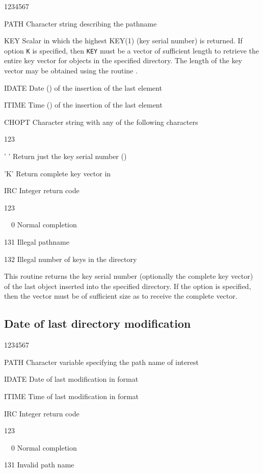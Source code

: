 \begin{DLtt}{1234567}
\item[PATH]Character string describing the pathname
\item[KEY]Scalar in which the highest KEY(1) (key serial number)
is returned. If option {\tt K} is specified, then {\tt KEY} must
be a vector of sufficient length to retrieve the entire key vector
for objects in the specified directory. The length of the key
vector may be obtained using the routine .
\item[IDATE]Date () of the insertion of the last element
\item[ITIME]Time ()   of the insertion of the last element
\item[CHOPT]Character string with any of the following characters
  \begin{DLtt}{123}
    \item[' ']Return just the key serial number ()
    \item['K']Return complete key vector in 
  \end{DLtt}
\item[IRC]Integer return code
  \begin{DLtt}{123}
    \item[\ \ 0]Normal completion
    \item[131]Illegal pathname
    \item[132]Illegal number of keys in the directory
  \end{DLtt}
\end{DLtt}

This routine returns the key serial number (optionally
the complete key vector) of the last object inserted
into the specified directory. If the option 
is specified, then the vector  must be of sufficient
size as to receive the complete vector.

\subsection{Date of last directory modification}


\begin{DLtt}{1234567}
\item[PATH]Character variable specifying the path name of interest
\item[IDATE]Date of last modification in  format
\item[ITIME]Time of last modification in    format
\item[IRC]Integer return code
  \begin{DLtt}{123}
    \item[\ \ 0]Normal completion
    \item[131]Invalid path name
  \end{DLtt}
\end{DLtt}

